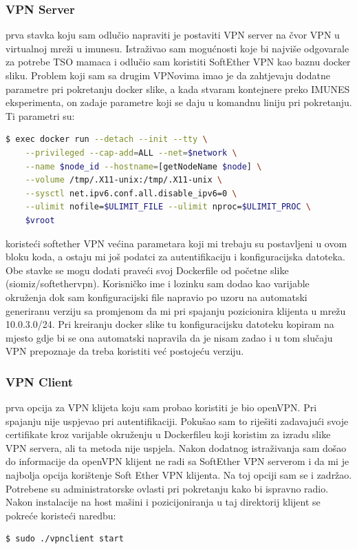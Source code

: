 \documentclass[times, utf8, zavrsni]{fer}
\begin{document}
\subsubsection{VPN Server}
prva stavka koju sam odlučio napraviti je postaviti VPN server na čvor VPN u virtualnoj mreži u imunesu. Istraživao sam mogućnosti koje bi najviše odgovarale za potrebe TSO mamaca i odlučio sam koristiti SoftEther VPN kao baznu docker sliku. Problem koji sam sa drugim VPNovima imao je da zahtjevaju dodatne parametre pri pokretanju docker slike, a kada stvaram kontejnere preko IMUNES eksperimenta, on zadaje parametre koji se daju u komandnu liniju pri pokretanju. 
Ti parametri su:
\begin{lstlisting}[language=bash, basicstyle=\footnotesize]
  $ exec docker run --detach --init --tty \
	--privileged --cap-add=ALL --net=$network \
	--name $node_id --hostname=[getNodeName $node] \
	--volume /tmp/.X11-unix:/tmp/.X11-unix \
	--sysctl net.ipv6.conf.all.disable_ipv6=0 \
	--ulimit nofile=$ULIMIT_FILE --ulimit nproc=$ULIMIT_PROC \
	$vroot
\end{lstlisting}

koristeći softether VPN većina parametara koji mi trebaju su postavljeni u ovom bloku koda, a ostaju mi još podatci za autentifikaciju i konfiguracijska datoteka. Obe stavke se mogu dodati praveći svoj Dockerfile od početne slike (siomiz/softethervpn). Korisničko ime i lozinku sam dodao kao varijable okruženja dok sam konfiguracijski file napravio po uzoru na automatski generiranu verziju sa promjenom da mi pri spajanju pozicionira klijenta u mrežu 10.0.3.0/24. Pri kreiranju docker slike tu konfiguracijsku datoteku kopiram na mjesto gdje bi se ona automatski napravila da je nisam zadao i u tom slučaju VPN prepoznaje da treba koristiti već postojeću verziju.

\subsubsection{VPN Client}
prva opcija za VPN klijeta koju sam probao koristiti je bio openVPN. Pri spajanju nije uspjevao pri autentifikaciji. Pokušao sam to riješiti zadavajući svoje certifikate kroz varijable okruženju u Dockerfileu koji koristim za izradu slike VPN servera, ali ta metoda nije uspjela. Nakon dodatnog istraživanja sam došao do informacije da openVPN klijent ne radi sa SoftEther VPN serverom i da mi je najbolja opcija korištenje Soft Ether VPN klijenta. Na toj opciji sam se i zadržao.  Potrebene su administratorske ovlasti pri pokretanju kako bi ispravno radio. Nakon instalacije na host mašini i pozicijoniranja u taj direktorij klijent se pokreće koristeći naredbu:
\begin{lstlisting}[language=bash, basicstyle=\footnotesize]
  $ sudo ./vpnclient start
\end{lstlisting}
\end{document}
